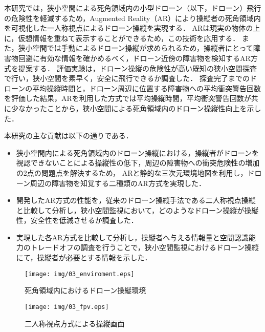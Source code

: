 \documentclass[submit, sigrecommended]{ipsj}
\begin{document}
\par
本研究では，狭小空間による死角領域内の小型ドローン（以下，ドローン）飛行の危険性を軽減するため，Augmented Reality（AR）により操縦者の死角領域内を可視化した一人称視点によるドローン操縦を実現する．
ARは現実の物体の上に，仮想情報を重ねて表示することができるため，この技術を応用する\cite{article-ar03}\cite{article-ar04}．
また，狭小空間では手動によるドローン操縦が求められるため，操縦者にとって障害物回避に有効な情報を確かめるべく，ドローン近傍の障害物を検知するAR方式を提案する．
評価実験は，ドローン操縦の危険性が高い既知の狭小空間探査で行い，狭小空間を素早く，安全に飛行できるか調査した．
探査完了までのドローンの平均操縦時間と，ドローン周辺に位置する障害物への平均衝突警告回数を評価した結果，ARを利用した方式では平均操縦時間，平均衝突警告回数が共に少なかったことから，狭小空間による死角領域内のドローン操縦性向上を示した．
\par
本研究の主な貢献は以下の通りである．
\begin{itemize}
  \item 狭小空間内による死角領域内のドローン操縦における，操縦者がドローンを視認できないことによる操縦性の低下，周辺の障害物への衝突危険性の増加の2点の問題点を解決するため，
  ARと静的な三次元環境地図を利用し，ドローン周辺の障害物を知覚する二種類のAR方式を実現した．
  \item 開発したAR方式の性能を，従来のドローン操縦手法である二人称視点操縦と比較して分析し，狭小空間監視において，どのようなドローン操縦が操縦性，安全性を低減させるか調査した．
  \item 実現した各AR方式を比較して分析し，操縦者へ与える情報量と空間認識能力のトレードオフの調査を行うことで，狭小空間監視におけるドローン操縦にて，操縦者が必要とする情報を示した．
\end{itemize}

\begin{figure}[tb]
  \centering
  \texttt{[image: img/03\_enviroment.eps]}
  \caption{死角領域内におけるドローン操縦環境}
  \label{fig:03_enviroment}
  \end{figure}
  
  \begin{figure}[tb]
    \centering
    \texttt{[image: img/03\_fpv.eps]}
    \caption{二人称視点方式による操縦画面}
    \label{fig:03_FPV}
  \end{figure}
  
\end{document}
